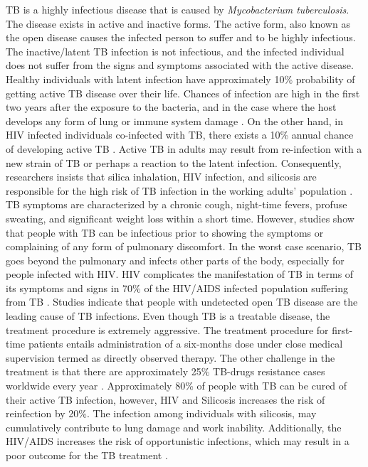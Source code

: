 TB is a highly infectious disease that is caused by \textit{Mycobacterium tuberculosis}. The disease exists in active and inactive forms. The active form, also known as the open disease causes the infected person to suffer and to be highly infectious. The inactive/latent TB infection is not infectious, and the infected individual does not suffer from the signs and symptoms associated with the active disease. Healthy individuals with latent infection have approximately 10\% probability of getting active TB disease over their life. Chances of infection are high in the first two years after the exposure to the bacteria, and in the case where the host develops any form of lung or immune system damage \cite{kaufmann_handbook_2008,zumla_handbook_2009}. On the other hand, in HIV infected individuals co-infected with TB, there exists a 10\% annual chance of developing active TB \cite{raviglione_tuberculosis_1997,sharma_hiv-tb_2005,toossi_impact_2001}. Active TB in adults may result from re-infection with a new strain of TB or perhaps a reaction to the latent infection. Consequently, researchers insists that silica inhalation, HIV infection, and silicosis are responsible for the high risk of TB infection in the working adults’ population \cite{sharma_hiv-tb_2005,danibrosio_epidemiology_2014}.
TB symptoms are characterized by a chronic cough, night-time fevers, profuse sweating, and significant weight loss within a short time. However, studies show that people with TB can be infectious prior to showing the symptoms or complaining of any form of pulmonary discomfort. In the worst case scenario, TB goes beyond the pulmonary and infects other parts of the body, especially for people infected with HIV. HIV complicates the manifestation of TB in terms of its symptoms and signs in 70\% of the HIV/AIDS infected population suffering from TB \cite{sharma_hiv-tb_2005}. Studies indicate that people with undetected open TB disease are the leading cause of TB infections. Even though TB is a treatable disease, the treatment procedure is extremely aggressive. The treatment procedure for first-time patients entails administration of a six-months dose under close medical supervision termed as directly observed therapy. The other challenge in the treatment is that there are approximately 25\% TB-drugs resistance cases worldwide every year \cite{centers_for_disease_control_and_prevention_cdc_emergence_2006,world_health_organization_multidrug_2010}. Approximately 80\% of people with TB can be cured of their active TB infection, however, HIV and Silicosis increases the risk of reinfection by 20\%. The infection among individuals with silicosis, may cumulatively contribute to lung damage and work inability. Additionally, the HIV/AIDS increases the risk of opportunistic infections, which may result in a poor outcome for the TB treatment \cite{cowie_epidemiology_1994,mulenga_silicosis_2013,rees_silica_2007}.\\
